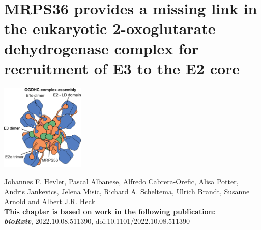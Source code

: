 \chapter{MRPS36 provides a missing link in the eukaryotic 2-oxoglutarate dehydrogenase complex for recruitment of E3 to the E2 core}\label{ch-5}
{
\begin{center}    
\footnotesize
\includegraphics[width=0.3\textwidth]{Chapter.5/Figures/OGDHC_schematic}
\end{center} 
}

{
\begin{flushleft}    
Johannes F. Hevler, Pascal Albanese, Alfredo Cabrera-Orefic, Alisa Potter, Andris Jankevics, Jelena Misic, Richard A. Scheltema, Ulrich Brandt, Susanne Arnold and Albert J.R. Heck\\
\vspace{0.3cm}
\textbf{This chapter is based on work in the following publication:}\\
\footnotesize
\textbf{\emph{bioRxiv}}, 2022.10.08.511390, doi:10.1101/2022.10.08.511390\\
\end{flushleft}
}

